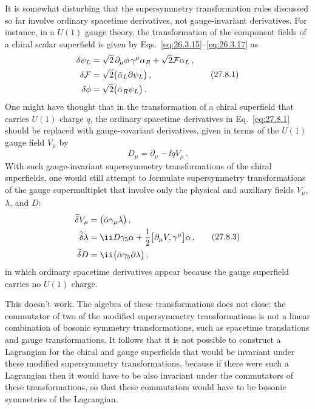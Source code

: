 It is somewhat disturbing that the supersymmetry transformation rules
discussed so far involve ordinary spacetime derivatives, not gauge-invariant
derivatives. For instance, in a \(U(1)\) gauge theory, the transformation of
the component fields of a chiral scalar superfield is given by
Eqs.~\eqref{eq:26.3.15}--\eqref{eq:26.3.17} as
\begin{equation}
  \begin{aligned}
    \delta\psi_L
    &=\sqrt{2}\,\partial_\mu\phi\,\gamma^\mu\alpha_R
      +\sqrt{2}\mathcal{F}\alpha_L\,,\\
    \delta\mathcal{F}
    &=\sqrt{2}\bigl(\bar\alpha_L\sl{\partial}\psi_L\bigr)\,,\\
    \delta\phi
    &=\sqrt{2}\bigl(\bar\alpha_R\psi_L\bigr)\,.
  \end{aligned}
  \tag{27.8.1}\label{eq:27.8.1}
\end{equation}
One might have thought that in the transformation of a chiral superfield
that carries \(U(1)\) charge \(q\), the ordinary spacetime derivatives in
Eq.~\eqref{eq:27.8.1} should be replaced with gauge-covariant derivatives,
given in terms of the \(U(1)\) gauge field \(V_\mu\) by
\begin{equation}
  D_\mu=\partial_\mu-\ii qV_\mu\,.
  \tag{27.8.2}\label{eq:27.8.2}
\end{equation}
With such gauge-invariant supersymmetry transformations of the chiral
superfields, one would still attempt to formulate supersymmetry
transformations of the gauge supermultiplet that involve only the physical
and auxiliary fields \(V_\mu\), \(\lambda\), and \(D\):
\begin{equation}
  \begin{aligned}
    \widetilde{\delta}V_\mu
    &=\bigl(\bar\alpha\gamma_\mu\lambda\bigr)\,,\\
    \widetilde{\delta}\lambda
    &=\ii D\gamma_5\alpha
      +\frac12\bigl[\partial_\mu\sl{V},\gamma^\mu\bigr]\alpha\,,\\
    \widetilde{\delta}D
    &=\ii\bigl(\bar\alpha\gamma_5\sl{\partial}\lambda\bigr)\,,
  \end{aligned}
  \tag{27.8.3}\label{eq:27.8.3}
\end{equation}
in which ordinary spacetime derivatives appear because the gauge superfield
carries no \(U(1)\) charge.

This doesn't work. The algebra of these transformations does not close: the
commutator of two of the modified supersymmetry transformations is not a
linear combination of bosonic symmetry transformations, such as spacetime
translations and gauge transformations. It follows that it is not possible
to construct a Lagrangian for the chiral and gauge superfields that would be
invariant under these modified supersymmetry transformations, because if
there were such a Lagrangian then it would have to be also invariant under
the commutators of these transformations, so that these commutators would
have to be bosonic symmetries of the Lagrangian.

